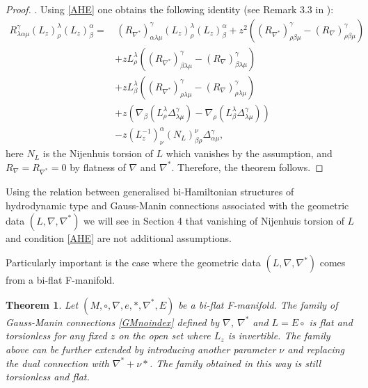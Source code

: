 \documentclass[11pt,a4paper]{amsart}
\numberwithin{equation}{section}
\newtheorem{theorem}{Theorem}[section]
\newcommand{\qa}{\alpha}
\newcommand{\qb}{\beta}
\newcommand{\qg}{\gamma}
\newcommand{\ql}{\lambda}
\numberwithin{equation}{section}
\begin{document}
\begin{proof}. Using \eqref{AHE} one obtains the following identity (see Remark 3.3 in \cite{AL_GM}):
\begin{align*}
R^\qg_{\ql\qa\mu}(L_z)^\ql_\rho(L_z)^\qa_\qb=&\,(R_{\nabla^*})^\qg_{\qa\ql\mu}(L_z)^\ql_\rho(L_z)^\qa_\qb+z^2\left((R_{\nabla^*})^\qg_{\rho\qb\mu}-(R_{\nabla})^\qg_{\rho\qb\mu}\right)\\
&+zL^\ql_\rho\left((R_{\nabla^*})^\qg_{\qb\ql\mu}-(R_{\nabla})^\qg_{\qb\ql\mu}\right)\\
&+zL^\ql_\qb\left((R_{\nabla^*})^\qg_{\rho\ql\mu}-(R_{\nabla})^\qg_{\rho\ql\mu}\right)\\
&+z\left(\nabla_\qb\left(L^\ql_\rho\Delta^\qg_{\ql\mu}\right)-\nabla_\rho\left(L^\ql_\qb\Delta^\qg_{\ql\mu}\right)\right)\\
&-z\left(L_z^{-1}\right)^\qa_\nu(N_L)^\nu_{\qb \rho}\Delta^\qg_{\qa\mu},
\end{align*}
here $N_L$ is the Nijenhuis torsion of $L$ which vanishes by the assumption, and $R_\nabla = R_{\nabla^*} = 0$ by flatness of $\nabla$ and $\nabla^*$. Therefore, the theorem follows.
\end{proof}

Using the relation between generalised bi-Hamiltonian  structures of hydrodynamic type and Gauss-Manin connections associated with the geometric data $(L,\nabla,\nabla^*)$ we  will see in Section 4 that vanishing of Nijenhuis torsion of $L$ and condition \eqref{AHE} are not additional assumptions.

Particularly important is the case  where  the geometric data $(L,\nabla,\nabla^*)$ comes from a bi-flat F-manifold.
\begin{theorem}\label{GMth}\cite{AL_GM}
Let $(M,\circ,\nabla,e,*,\nabla^*,E)$ be a bi-flat F-manifold. 
The  family of Gauss-Manin connections \eqref{GMnoindex} defined by $\nabla$, $\nabla^*$ and  $L=E\circ $ is flat and torsionless for any fixed $z$ on the open set where $L_z$ is invertible. The family above can be further extended by introducing another parameter $\nu$ and
replacing the dual connection with $\nabla^* + \nu *$. The family obtained in this way is still  torsionless and flat.
\end{theorem}
\end{document}
